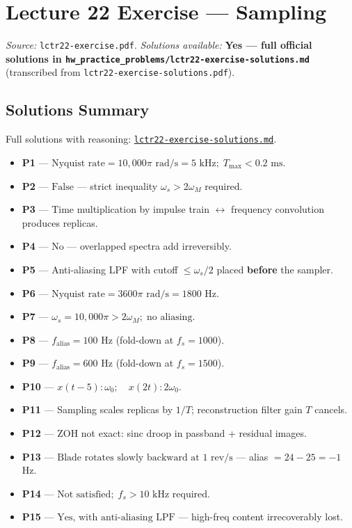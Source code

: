 \documentclass[11pt]{article}
\begin{document}
\section{Lecture 22 Exercise --- Sampling}
\emph{Source:} \texttt{lctr22-exercise.pdf}. \emph{Solutions available:} \textbf{Yes --- full official solutions in \texttt{hw\_practice\_problems/lctr22-exercise-solutions.md}} (transcribed from \texttt{lctr22-exercise-solutions.pdf}).

\subsection*{Solutions Summary}

Full solutions with reasoning: \href{../hw_practice_problems/lctr22-exercise-solutions.md}{\texttt{lctr22-exercise-solutions.md}}.

\begin{itemize}[leftmargin=*, nosep]
  \item \textbf{P1} --- $\boxed{\text{Nyquist rate} = 10{,}000\pi \text{ rad/s} = 5\text{ kHz};\; T_{\max}<0.2\text{ ms}}$.
  \item \textbf{P2} --- $\boxed{\text{False}}$ --- strict inequality $\omega_s>2\omega_M$ required.
  \item \textbf{P3} --- Time multiplication by impulse train $\leftrightarrow$ frequency convolution produces replicas.
  \item \textbf{P4} --- $\boxed{\text{No}}$ --- overlapped spectra add irreversibly.
  \item \textbf{P5} --- Anti-aliasing LPF with cutoff $\le\omega_s/2$ placed \textbf{before} the sampler.
  \item \textbf{P6} --- $\boxed{\text{Nyquist rate} = 3600\pi \text{ rad/s} = 1800\text{ Hz}}$.
  \item \textbf{P7} --- $\boxed{\omega_s = 10{,}000\pi > 2\omega_M;\; \text{no aliasing}}$.
  \item \textbf{P8} --- $\boxed{f_{\text{alias}} = 100\text{ Hz}}$ (fold-down at $f_s=1000$).
  \item \textbf{P9} --- $\boxed{f_{\text{alias}} = 600\text{ Hz}}$ (fold-down at $f_s=1500$).
  \item \textbf{P10} --- $\boxed{x(t-5)\!:\omega_0;\quad x(2t)\!:2\omega_0}$.
  \item \textbf{P11} --- Sampling scales replicas by $1/T$; reconstruction filter gain $T$ cancels.
  \item \textbf{P12} --- ZOH not exact: sinc droop in passband + residual images.
  \item \textbf{P13} --- $\boxed{\text{Blade rotates slowly backward at 1 rev/s}}$ --- alias $= 24-25 = -1$ Hz.
  \item \textbf{P14} --- $\boxed{\text{Not satisfied};\; f_s>10\text{ kHz required}}$.
  \item \textbf{P15} --- $\boxed{\text{Yes, with anti-aliasing LPF}}$ --- high-freq content irrecoverably lost.
\end{itemize}
\end{document}
